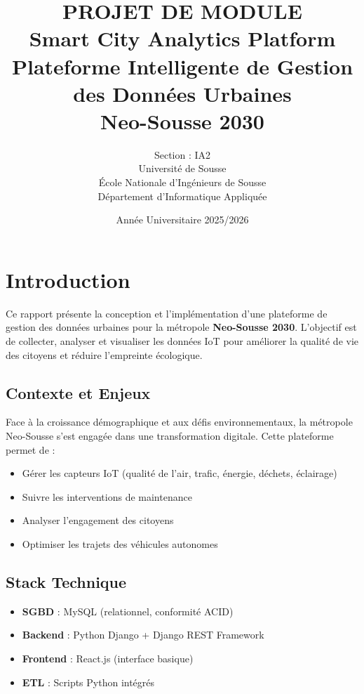 \documentclass[12pt,a4paper]{article}
\title{
    \textbf{PROJET DE MODULE}\\
    \vspace{0.5cm}
    \Large Smart City Analytics Platform\\
    \large Plateforme Intelligente de Gestion des Données Urbaines\\
    \vspace{1cm}
    \normalsize Neo-Sousse 2030
}
\author{
    Section : IA2\\
    \vspace{0.5cm}
    Université de Sousse\\
    École Nationale d'Ingénieurs de Sousse\\
    Département d'Informatique Appliquée
}
\date{Année Universitaire 2025/2026}
\begin{document}
\maketitle
\thispagestyle{empty}
\newpage

\tableofcontents
\newpage

\section{Introduction}

Ce rapport présente la conception et l'implémentation d'une plateforme de gestion des données urbaines pour la métropole \textbf{Neo-Sousse 2030}. L'objectif est de collecter, analyser et visualiser les données IoT pour améliorer la qualité de vie des citoyens et réduire l'empreinte écologique.

\subsection{Contexte et Enjeux}
Face à la croissance démographique et aux défis environnementaux, la métropole Neo-Sousse s'est engagée dans une transformation digitale. Cette plateforme permet de :
\begin{itemize}
    \item Gérer les capteurs IoT (qualité de l'air, trafic, énergie, déchets, éclairage)
    \item Suivre les interventions de maintenance
    \item Analyser l'engagement des citoyens
    \item Optimiser les trajets des véhicules autonomes
\end{itemize}

\subsection{Stack Technique}
\begin{itemize}
    \item \textbf{SGBD} : MySQL (relationnel, conformité ACID)
    \item \textbf{Backend} : Python Django + Django REST Framework
    \item \textbf{Frontend} : React.js (interface basique)
    \item \textbf{ETL} : Scripts Python intégrés
\end{itemize}
\end{document}
